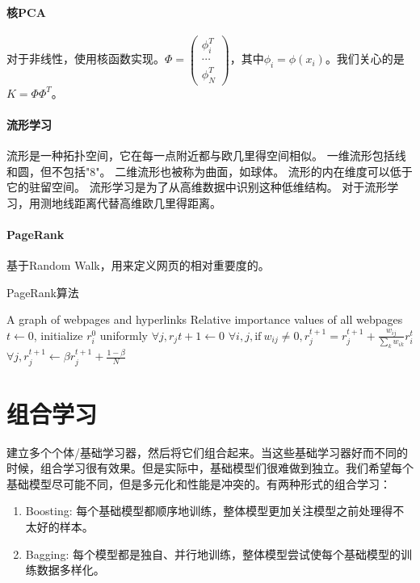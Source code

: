 \paragraph{核PCA}
对于非线性，使用核函数实现。$\Phi = \begin{pmatrix}
    \phi_i^T \\
    \cdots \\
    \phi_N^T
\end{pmatrix}$，其中$\phi_i = \phi(x_i)$。我们关心的是$K = \Phi\Phi^T$。

\paragraph{流形学习}
流形是一种拓扑空间，它在每一点附近都与欧几里得空间相似。
一维流形包括线和圆，但不包括"8"。
二维流形也被称为曲面，如球体。
流形的内在维度可以低于它的驻留空间。
流形学习是为了从高维数据中识别这种低维结构。
对于流形学习，用测地线距离代替高维欧几里得距离。


\paragraph{PageRank} 基于Random Walk，用来定义网页的相对重要度的。
\begin{algorithm}[H]
\caption{PageRank算法}
\label{alg:PageRank}
\begin{algorithmic}[1]
\Require A graph of webpages and hyperlinks
\Ensure Relative importance values of all webpages
\State $t \leftarrow 0$, initialize $r_i^0$ uniformly
\Repeat
\State $\forall j, r_j{t+1} \leftarrow 0$
\State $\forall i,j, \mathrm{if}\ w_{ij} \neq 0, r_j^{t+1} = r_j^{t+1} + \frac{w_{ij}}{\sum_k w_{ik}}r_i^t$
\State $\forall j, r_j^{t+1} \leftarrow \beta r_j^{t+1} + \frac{1-\beta}{N}$
\end{algorithmic}
\end{algorithm}

\section{组合学习}
建立多个个体/基础学习器，然后将它们组合起来。当这些基础学习器好而不同的时候，组合学习很有效果。但是实际中，基础模型们很难做到独立。我们希望每个基础模型尽可能不同，但是多元化和性能是冲突的。有两种形式的组合学习：
\begin{enumerate}
    \item Boosting: 每个基础模型都顺序地训练，整体模型更加关注模型之前处理得不太好的样本。
    \item Bagging: 每个模型都是独自、并行地训练，整体模型尝试使每个基础模型的训练数据多样化。
\end{enumerate}

